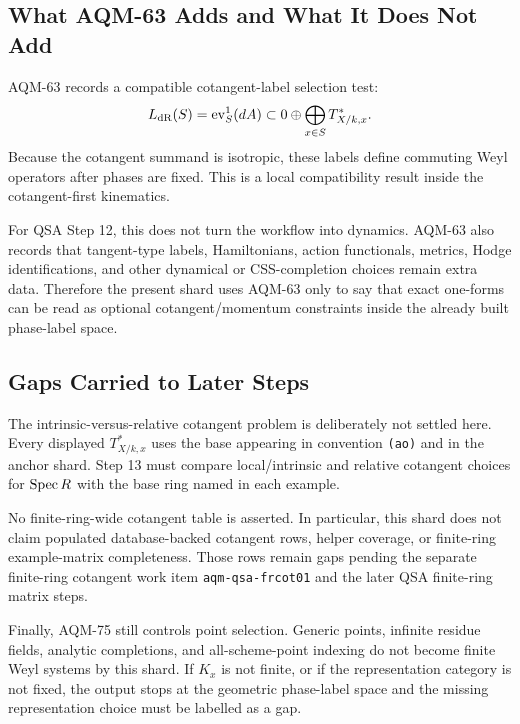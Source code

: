 \subsection{What AQM-63 Adds and What It Does Not Add}

AQM-63 records a compatible cotangent-label selection test:
\[
  L_{\rm dR}(S)=\operatorname{ev}^1_S(dA)
  \subset 0\oplus\bigoplus_{x\in S}T^*_{X/k,x}.
\]
Because the cotangent summand is isotropic, these labels define commuting
Weyl operators after phases are fixed.  This is a local compatibility result
inside the cotangent-first kinematics.

For QSA Step 12, this does not turn the workflow into dynamics.  AQM-63 also
records that tangent-type labels, Hamiltonians, action functionals, metrics,
Hodge identifications, and other dynamical or CSS-completion choices remain
extra data.  Therefore the present shard uses AQM-63 only to say that exact
one-forms can be read as optional cotangent/momentum constraints inside the
already built phase-label space.

\subsection{Gaps Carried to Later Steps}

The intrinsic-versus-relative cotangent problem is deliberately not settled
here.  Every displayed \(T^*_{X/k,x}\) uses the base appearing in convention
\texttt{(ao)} and in the anchor shard.  Step 13 must compare local/intrinsic
and relative cotangent choices for \(\operatorname{Spec} R\) with the base ring named in
each example.

No finite-ring-wide cotangent table is asserted.  In particular, this shard
does not claim populated database-backed cotangent rows, helper coverage, or
finite-ring example-matrix completeness.  Those rows remain gaps pending the
separate finite-ring cotangent work item \texttt{aqm-qsa-frcot01} and the
later QSA finite-ring matrix steps.

Finally, AQM-75 still controls point selection.  Generic points, infinite
residue fields, analytic completions, and all-scheme-point indexing do not
become finite Weyl systems by this shard.  If \(K_x\) is not finite, or if
the representation category is not fixed, the output stops at the geometric
phase-label space and the missing representation choice must be labelled as a
gap.
